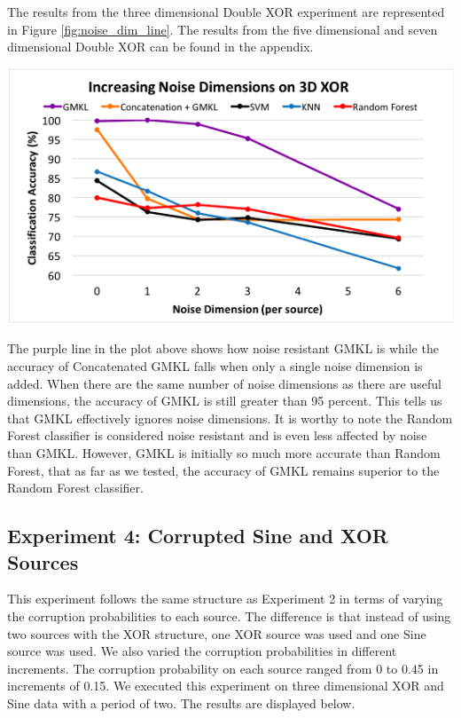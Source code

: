 \documentclass{article}
\begin{document}
The results from the three dimensional Double XOR experiment are represented in
Figure \ref{fig:noise_dim_line}. The results from the five dimensional and
seven dimensional Double XOR can be found in the appendix.

\begin{minipage}{\textwidth}
    \centering
    \includegraphics[scale=0.7]{Noise_Dim_line.png}
    \label{fig:noise_dim_line}
\end{minipage}

The purple line in the plot above shows how noise resistant GMKL is while the
accuracy of Concatenated GMKL falls when only a single noise dimension is
added. When there are the same number of noise dimensions as there are useful
dimensions, the accuracy of GMKL is still greater than 95 percent. This tells
us that GMKL effectively ignores noise dimensions. It is worthy to note the
Random Forest classifier is considered noise resistant and is even less
affected by noise than GMKL. However, GMKL is initially so much more accurate
than Random Forest, that as far as we tested, the accuracy of GMKL remains
superior to the Random Forest classifier.



\subsection*{Experiment 4: Corrupted Sine and XOR Sources}

This experiment follows the same structure as Experiment 2 in terms of varying
the corruption probabilities to each source. The difference is that instead of
using two sources with the XOR structure, one XOR source was used and one Sine
source was used. We also varied the corruption probabilities in different
increments. The corruption probability on each source ranged from 0 to 0.45 in
increments of 0.15. We executed this experiment on three dimensional XOR and
Sine data with a period of two. The results are displayed below.
\end{document}

